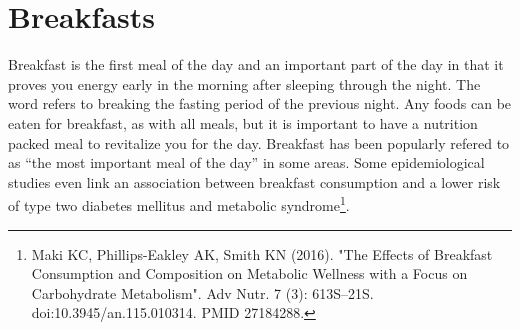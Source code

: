 \AddToShipoutPicture*{\SteakAndEggs}
\chapter{Breakfasts}

Breakfast is the first meal of the day and an important part of the day in that it proves you energy early in the morning after sleeping through the night. The word refers to breaking the fasting period of the previous night. Any foods can be eaten for breakfast, as with all meals, but it is important to have a nutrition packed meal to revitalize you for the day. Breakfast has been popularly refered to as ``the most important meal of the day'' in some areas. Some epidemiological studies even link an association between breakfast consumption and a lower risk of type two diabetes mellitus and metabolic syndrome\footnote{Maki KC, Phillips-Eakley AK, Smith KN (2016). "The Effects of Breakfast Consumption and Composition on Metabolic Wellness with a Focus on Carbohydrate Metabolism". Adv Nutr. 7 (3): 613S–21S. doi:10.3945/an.115.010314. PMID 27184288.}.